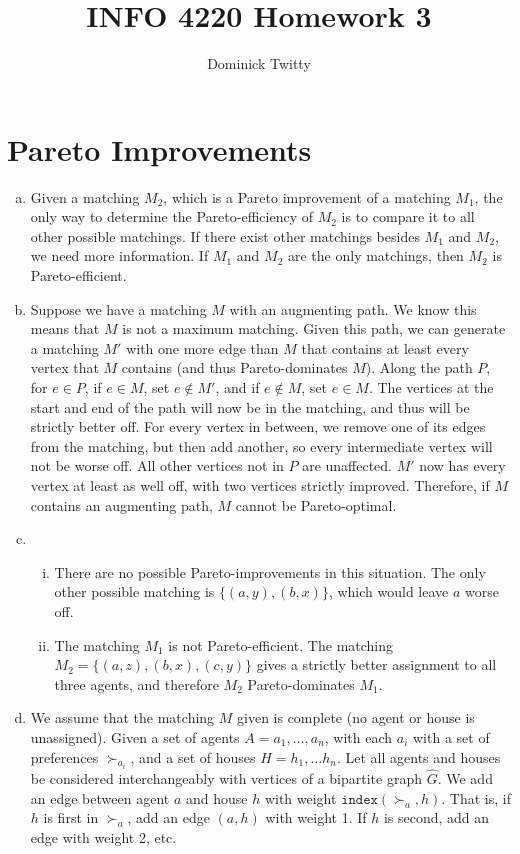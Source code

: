 \documentclass[12pt]{article}
\begin{document}
\title{INFO 4220 Homework 3}
\author{Dominick Twitty}
\date{}
\maketitle
\section{Pareto Improvements}
\begin{enumerate}[(a)]
\item Given a matching $M_2$, which is a Pareto improvement of a matching $M_1$, the only way to determine the Pareto-efficiency of $M_2$ is to compare it to all other possible matchings. If there exist other matchings besides $M_1$ and $M_2$, we need more information.  If $M_1$ and $M_2$ are the only matchings, then $M_2$ is Pareto-efficient.

\item Suppose we have a matching $M$ with an augmenting path. We know this means that $M$ is not a maximum matching. Given this path, we can generate a matching $M'$ with one more edge than $M$ that contains at least every vertex that $M$ contains (and thus Pareto-dominates $M$). Along the path $P$, for $e \in P$, if $e \in M$, set $e \notin M'$, and if $e \notin M$, set $e \in M$. The vertices at the start and end of the path will now be in the matching, and thus will be strictly better off. For every vertex in between, we remove one of its edges from the matching, but then add another, so every intermediate vertex will not be worse off. All other vertices not in $P$ are unaffected. $M'$ now has every vertex at least as well off, with two vertices strictly improved. Therefore, if $M$ contains an augmenting path, $M$ cannot be Pareto-optimal.

\item 
\begin{enumerate}[i.]
\item There are no possible Pareto-improvements in this situation. The only other possible matching is $\{(a, y), (b, x)\}$, which would leave $a$ worse off.
\item The matching $M_1$ is not Pareto-efficient. The matching $M_2 = \{(a, z), (b, x), (c, y)\}$ gives a strictly better assignment to all three agents, and therefore $M_2$ Pareto-dominates $M_1$.
\end{enumerate}

\item 
We assume that the matching $M$ given is complete (no agent or house is unassigned). Given a set of agents $A = a_1,\ldots,a_n$, with each $a_i$ with a set of preferences $\succ_{a_i}$, and a set of houses $H = h_1,\ldots h_n$. Let all agents and houses be considered interchangeably with vertices of a bipartite graph $\hat{G}$. We add an edge between agent $a$ and house $h$ with weight $\texttt{index}(\succ_a, h)$. That is, if $h$ is first in $\succ_a$, add an edge $(a, h)$ with weight 1. If $h$ is second, add an edge with weight 2, etc.


\end{enumerate}
\end{document}
